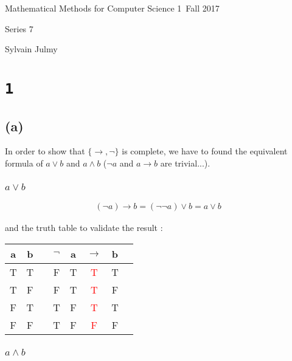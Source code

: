 \documentclass[a4paper,11pt]{report}
\author{Sylvain Julmy}
\date{\today}
\begin{document}
\begin{center}
  \Large{
    Mathematical Methods for Computer Science 1\
    Fall 2017
  }
  \noindent\makebox[\linewidth]{\rule{\linewidth}{0.4pt}}

  Series 7
  \vspace*{1.4cm}

  Sylvain Julmy
  
  \noindent\makebox[\linewidth]{\rule{\linewidth}{0.4pt}}
\end{center}

\section*{\texttt{1}}

\subsection*{(a)}

In order to show that $\{\rightarrow,\neg\}$ is complete, we have to found the
equivalent formula of $a \vee b$ and $a \wedge b$ ($\neg a$ and $a \rightarrow b$
are trivial...).

\subsubsection*{$a \vee b$}

\begin{gather*}
  (\neg a) \rightarrow b = (\neg \neg a) \vee b = a \vee b
\end{gather*}

and the truth table to validate the result :

\begin{center}
  \begin{tabular}{@{ }c@{ }@{ }c | c@{ }@{ }c@{ }@{ }c@{ }@{ }c@{ }@{ }c@{ }@{ }c}
    a & b &  & $\neg$ & a & $\rightarrow$ & b & \\
    \hline 
    T & T &  & F & T & \textcolor{red}{T} & T & \\
    T & F &  & F & T & \textcolor{red}{T} & F & \\
    F & T &  & T & F & \textcolor{red}{T} & T & \\
    F & F &  & T & F & \textcolor{red}{F} & F & \\
  \end{tabular}
\end{center}

\subsubsection*{$a \wedge b$}
\end{document}
